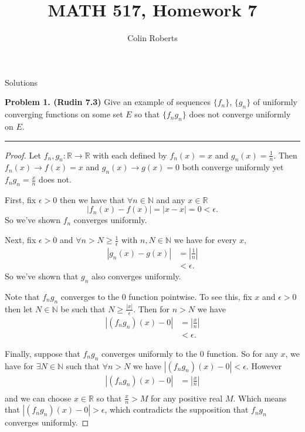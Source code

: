 \documentclass[leqno]{article}
\author{Colin Roberts}
\title{MATH 517, Homework 7}
\theoremstyle{nonumberplain}
\newtheorem{proof}{Proof}
\newcommand{\R}{\mathbb{R}}
\begin{document}
\maketitle
\begin{large}
\begin{center}
Solutions
\end{center}
\end{large}
\pagebreak


\noindent\textbf{Problem 1. (Rudin 7.3)} Give an example of sequences $\{f_n\}$, $\{g_n\}$ of uniformly converging functions on some set $E$ so that $\{f_n g_n \}$ does not converge uniformly on $E$.
 

\noindent\rule[0.5ex]{\linewidth}{1pt}

\begin{proof}
Let $f_n,g_n \colon \R \to \R$ with each defined by $f_n (x) = x$ and $g_n(x)=\frac{1}{n}$.  Then $f_n(x) \to f(x)=x$ and $g_n(x)\to g(x)=0$ both converge uniformly yet $f_ng_n = \frac{x}{n}$ does not.

First, fix $\epsilon>0$ then we have that $\forall n \in \mathbb{N}$ and any $x\in \mathbb{R}$
\[
|f_n(x)-f(x)|=|x-x|=0<\epsilon.
\]
So we've shown $f_n$ converges uniformly.

Next, fix $\epsilon>0$ and $\forall n>N\geq \frac{1}{\epsilon}$ with $n,N\in \mathbb{N}$ we have for every $x$,
\begin{align*}
\left|g_n(x)-g(x)\right| &= \left| \frac{1}{n} \right|\\
&<\epsilon.
\end{align*}
So we've shown that $g_n$ also converges uniformly.

Note that $f_n g_n$ converges to the $0$ function pointwise.  To see this, fix $x$ and $\epsilon>0$ then let $N\in \mathbb{N}$ be such that $N\geq \frac{|x|}{\epsilon}$. Then for $n>N$ we have
\begin{align*}
|(f_n g_n)(x)-0|&=\left| \frac{x}{n} \right|\\
&<\epsilon.
\end{align*}

Finally, suppose that $f_n g_n$ converges uniformly to the $0$ function.  So for any $x$, we have for $\exists N \in \mathbb{N}$ such that $\forall n>N$ we have $|(f_n g_n)(x)-0|<\epsilon$. However
\begin{align*}
|(f_n g_n)(x) - 0| &= \left|\frac{x}{n}\right|\\
\end{align*}
and we can choose $x\in \R$ so that $\frac{x}{n}>M$ for any positive real $M$. Which means that $|(f_n g_n)(x)-0|>\epsilon$, which contradicts the supposition that $f_n g_n$ converges uniformly.
\end{proof}
\end{document}

